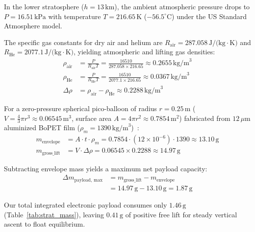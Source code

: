 \documentclass[10pt,twocolumn,letterpaper]{article}
\begin{document}
In the lower stratosphere ($h = 13\,\text{km}$), the ambient atmospheric pressure drops to $P = 16.51\,\text{kPa}$ with temperature $T = 216.65\,\text{K}$ ($-56.5^{\circ}\text{C}$) under the US Standard Atmosphere model.

The specific gas constants for dry air and helium are $R_{\text{air}} = 287.058\,\text{J/(kg}\cdot\text{K)}$ and $R_{\text{He}} = 2077.1\,\text{J/(kg}\cdot\text{K)}$, yielding atmospheric and lifting gas densities:
\begin{align}
\rho_{\text{air}} &= \frac{P}{R_{\text{air}} T} = \frac{16510}{287.058 \times 216.65} \approx 0.2655\,\text{kg/m}^3 \\
\rho_{\text{He}} &= \frac{P}{R_{\text{He}} T} = \frac{16510}{2077.1 \times 216.65} \approx 0.0367\,\text{kg/m}^3 \\
\Delta \rho &= \rho_{\text{air}} - \rho_{\text{He}} \approx 0.2288\,\text{kg/m}^3
\end{align}

For a zero-pressure spherical pico-balloon of radius $r = 0.25\,\text{m}$ ($V = \frac{4}{3}\pi r^3 \approx 0.06545\,\text{m}^3$, surface area $A = 4\pi r^2 \approx 0.7854\,\text{m}^2$) fabricated from $12\,\mu\text{m}$ aluminized BoPET film ($\rho_m = 1390\,\text{kg/m}^3$)~\cite{sterran2019picoballoon}:
\begin{align}
m_{\text{envelope}} &= A \cdot t \cdot \rho_m = 0.7854 \cdot (12\times 10^{-6}) \cdot 1390 \approx 13.10\,\text{g} \\
m_{\text{gross\_lift}} &= V \cdot \Delta \rho = 0.06545 \times 0.2288 \approx 14.97\,\text{g}
\end{align}

Subtracting envelope mass yields a maximum net payload capacity:
\begin{align}
\Delta m_{\text{payload, max}} &= m_{\text{gross\_lift}} - m_{\text{envelope}} \nonumber \\
&= 14.97\,\text{g} - 13.10\,\text{g} = 1.87\,\text{g}
\end{align}

Our total integrated electronic payload consumes only $1.46\,\text{g}$ (Table~\ref{tab:strat_mass}), leaving $0.41\,\text{g}$ of positive free lift for steady vertical ascent to float equilibrium.
\end{document}
